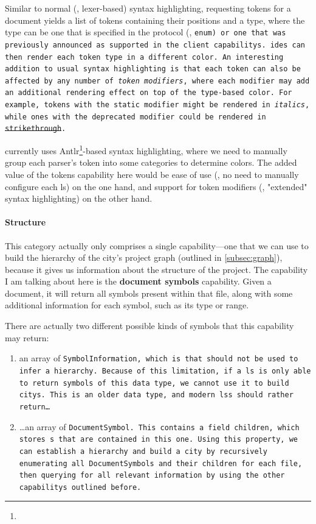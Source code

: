 \documentclass[../thesis]{subfiles}
\begin{document}
\begin{itemize}
	      Similar to normal (\eg, lexer-based) syntax highlighting, requesting \glspl{token} for a document yields a list of tokens containing their positions and a type, where the type can be one that is specified in the protocol (\eg, \tt{enum}) or one that was previously announced as supported in the client \glspl{capability}.
	      \glspl{ide} can then render each token type in a different color.
	      An interesting addition to usual syntax highlighting is that each token can also be affected by any number of \emph{token modifiers}, where each modifier may add an additional rendering effect on top of the type-based color.
	      For example, tokens with the \tt{static} modifier might be rendered in \textit{italics}, while ones with the \tt{deprecated} modifier could be rendered in \st{strikethrough}.

	      \SEE{} currently uses Antlr\footnote{}-based syntax highlighting, where we need to manually group each parser's token into some categories to determine colors.
	      The added value of the \glspl{token} \gls{capability} here would be ease of use (\ie, no need to manually configure each \gls{ls}) on the one hand, and support for token modifiers (\ie, "extended" syntax highlighting) on the other hand.
\end{itemize}


\paragraph{Structure}
This category actually only comprises a single \gls{capability}---one that we can use to build the hierarchy of the \gls{city}'s project graph (outlined in \cref{subsec:graph}), because it gives us information about the structure of the project.
The \gls{capability} I am talking about here is the \textbf{document symbols} \gls{capability}.
Given a document, it will return all symbols present within that file, along with some additional information for each symbol, such as its type or \gls{range}.

There are actually two different possible kinds of symbols that this \gls{capability} may return:
\begin{enumerate}
	\item an array of \tt{SymbolInformation}, which is  that should not be used to infer a hierarchy.
	      Because of this limitation, if a \gls{ls} is only able to return symbols of this data type, we cannot use it to build \glspl{city}.
	      This is an older data type, and modern \glspl{ls} should rather return\dots
	\item \dots{}an array of \tt{DocumentSymbol}.
	      This contains a field \tt{children}, which stores s that are contained in this one.
	      Using this property, we can establish a hierarchy and build a \gls{city} by recursively enumerating all \tt{DocumentSymbol}s and their children for each file, then querying for all relevant information by using the other \glspl{capability} outlined before.
\end{enumerate}
\end{document}

